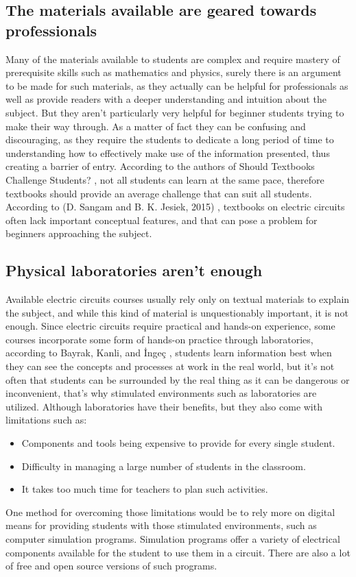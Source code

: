 \documentclass[../main.tex]{subfiles}
\begin{document}
\subsection{The materials available are geared towards professionals}
Many of the materials available to students are complex and require mastery of prerequisite skills such as mathematics and physics, surely there is an argument to be made for such materials, as they actually can be helpful for professionals as well as provide readers with a deeper understanding and intuition about the subject. But they aren’t particularly very helpful for beginner students trying to make their way through. As a matter of fact they can be confusing and discouraging, as they require the students to dedicate a long period of time to understanding how to effectively make use of the information presented, thus creating a barrier of entry. According to the authors of Should Textbooks Challenge Students? \cite{19}, not all students can learn at the same pace, therefore textbooks should provide an average challenge that can suit all students. 
According to (D. Sangam and B. K. Jesiek, 2015) \cite{20}, textbooks on electric circuits often lack important conceptual features, and that can pose a problem for beginners approaching the subject.

\subsection{Physical laboratories aren’t enough}
Available electric circuits courses usually rely only on textual materials to explain the subject, and while this kind of material is unquestionably important, it is not enough. Since electric circuits require practical and hands-on experience, some courses incorporate some form of hands-on practice through laboratories, according to Bayrak, Kanli, and İngeç \cite{21}, students learn information best when they can see the concepts and processes at work in the real world, but it’s not often that students can be surrounded by the real thing as it can be dangerous or inconvenient, that’s why stimulated environments such as laboratories are utilized. Although laboratories have their benefits, but they also come with limitations such as:
\begin{itemize}
    \item Components and tools being expensive to provide for every single student.
    \item Difficulty in managing a large number of students in the classroom.
    \item It takes too much time for teachers to plan such activities.
\end{itemize}
One method for overcoming those limitations would be to rely more on digital means for providing students with those stimulated environments, such as computer simulation programs. Simulation programs offer a variety of electrical components available for the student to use them in a circuit. There are also a lot of free and open source versions of such programs.
\end{document}
